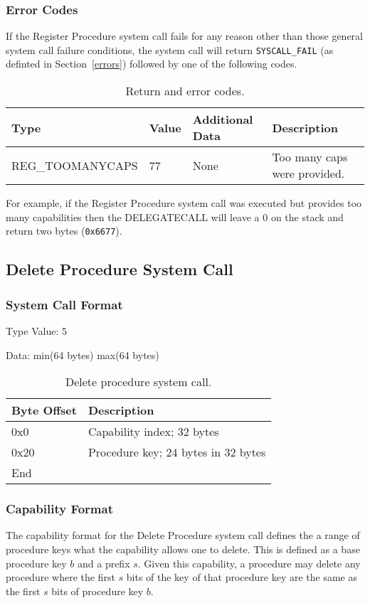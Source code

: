 \documentclass[english,a4paper]{article}
\let\oldparagraph\subsubsection
\renewcommand{\subsubsection}[1]{\oldparagraph{#1}\mbox{}}
\begin{document}
\subsubsection{Error Codes}
If the Register Procedure system call fails for any reason other than those
general system call failure conditions, the system call will return
\texttt{SYSCALL\_FAIL} (as definted in Section~\ref{errors}) followed by one of
the following codes.

\begin{table}[H]
  \caption{Return and error codes.}
  \centering{}%
  \begin{tabular}{l|l|p{}|p{}}
    \hline
    Type & Value & Additional Data & Description\tabularnewline
    \hline
    \hline
    REG\_TOOMANYCAPS  & 77 & None & Too many caps were provided. \tabularnewline
    \hline
  \end{tabular}
\end{table}

For example, if the Register
Procedure system call was executed but provides too many capabilities then the
DELEGATECALL will leave a 0 on the stack and return two bytes (\texttt{0x6677}).

\subsection{Delete Procedure System Call}

\subsubsection{System Call Format}
Type Value: 5

Data: min(64 bytes) max(64 bytes)

\begin{table}[H]
  \caption{Delete procedure system call.}
  \centering{}%
  \begin{tabular}{l|p{}}
    \hline
    Byte Offset & Description\tabularnewline
    \hline
    \hline
    0x0 & Capability index; 32 bytes \tabularnewline
    0x20 & Procedure key; 24 bytes in 32 bytes \tabularnewline
    \hline
    End &  \tabularnewline
    \hline
  \end{tabular}
\end{table}

\subsubsection{Capability Format}
The capability format for the Delete Procedure system call defines the a range
of procedure keys what the capability allows one to delete. This is defined as a
base procedure key $b$ and a prefix $s$. Given this capability, a procedure may
delete any procedure where the first $s$ bits of the key of that procedure key are
the same as the first $s$ bits of procedure key $b$.
\end{document}
